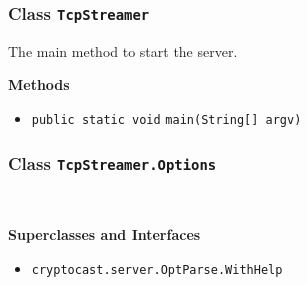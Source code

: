 \subsubsection{Class \lstinline|TcpStreamer|}
The main method to start the server. \\
\noindent\begin{minipage}[t]{5cm}
\vspace{0.3em}
\hspace*{2em}
\vspace{0.3em}
\end{minipage}





\textbf{\sffamily Methods}
\begin{itemize}
\item \lstinline|public static void| \lstinline|main|\lstinline|(String[] argv)| \\[-0.6em]




\end{itemize}

\subsubsection{Class \lstinline|TcpStreamer.Options|}
 \\
\noindent\begin{minipage}[t]{5cm}
\vspace{0.3em}
\hspace*{2em}
\vspace{0.3em}
\end{minipage}



\textbf{\sffamily Superclasses and Interfaces}
\begin{itemize}
\item \lstinline|cryptocast.server.OptParse.WithHelp|
\end{itemize}



